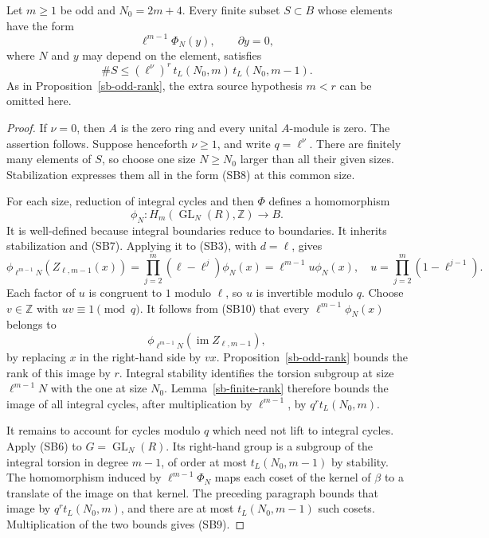 \begin{theorem}\label{sb-upper}
Let \(m\ge1\) be odd and \(N_0=2m+4\).
Every finite subset \(S\subset B\) whose elements have
the form
\[
                \ell^{m-1}\Phi_N(y),
       \qquad \partial y=0,
 \tag{SB8}
\]
where \(N\) and \(y\) may depend on the element,
satisfies
\[
 \#S\le (\ell^\nu)^r\,
       t_L(N_0,m)\,t_L(N_0,m-1).
 \tag{SB9}
\]
As in Proposition~\ref{sb-odd-rank}, the extra
source hypothesis \(m<r\) can be omitted here.
\end{theorem}
\begin{proof}
If \(\nu=0\), then \(A\) is the zero ring and every
unital \(A\)-module is zero.  The assertion follows.
Suppose henceforth \(\nu\ge1\), and write
\(q=\ell^\nu\).
There are finitely many elements of \(S\), so choose
one size \(N\ge N_0\) larger than all their given sizes.
Stabilization expresses them all in the form (SB8)
at this common size.

For each size, reduction of integral cycles and then
\(\Phi\) defines a homomorphism
\[
 \phi_N:H_m(\operatorname{GL}_N(R),\mathbb Z)
                        \longrightarrow B.
\]
It is well-defined because integral boundaries reduce
to boundaries.  It inherits stabilization and (SB7).
Applying it to (SB3), with \(d=\ell\), gives
\[
 \phi_{\ell^{m-1}N}(Z_{\ell,m-1}(x))
    =\prod_{j=2}^{m}(\ell-\ell^j)\phi_N(x)
    =\ell^{m-1}u\phi_N(x),
 \quad
 u=\prod_{j=2}^{m}(1-\ell^{j-1}).
 \tag{SB10}
\]
Each factor of \(u\) is congruent to \(1\) modulo
\(\ell\), so \(u\) is invertible modulo \(q\).
Choose \(v\in\mathbb Z\) with \(uv\equiv1\pmod q\).
It follows from (SB10) that every
\(\ell^{m-1}\phi_N(x)\) belongs to
\[
 \phi_{\ell^{m-1}N}
       (\operatorname{im}Z_{\ell,m-1}),
\]
by replacing \(x\) in the right-hand side by \(vx\).
Proposition~\ref{sb-odd-rank} bounds the rank of this
image by \(r\).  Integral stability identifies the
torsion subgroup at size \(\ell^{m-1}N\) with the one
at size \(N_0\).  Lemma~\ref{sb-finite-rank} therefore
bounds the image of all integral cycles, after
multiplication by \(\ell^{m-1}\), by
\(q^r t_L(N_0,m)\).

It remains to account for cycles modulo \(q\) which
need not lift to integral cycles.  Apply (SB6) to
\(G=\operatorname{GL}_N(R)\).
Its right-hand group is a subgroup of the integral
torsion in degree \(m-1\), of order at most
\(t_L(N_0,m-1)\) by stability.
The homomorphism induced by
\(\ell^{m-1}\Phi_N\) maps each coset of the kernel
of \(\beta\) to a translate of the image on that
kernel.  The preceding paragraph bounds that image
by \(q^r t_L(N_0,m)\), and there are at most
\(t_L(N_0,m-1)\) such cosets.  Multiplication of the
two bounds gives (SB9).
\end{proof}

